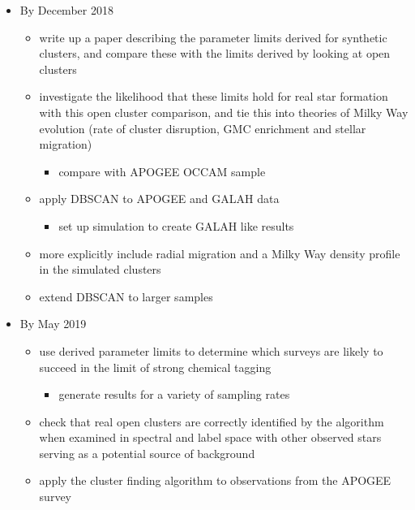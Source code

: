 \documentclass[11pt]{article}
\begin{document}
\begin{itemize}

\item By December 2018
\begin{itemize}
\item {\color{RoyalBlue} write up a paper describing the parameter limits derived for synthetic clusters, and compare these with the limits derived by looking at open clusters}
\item {\color{ForestGreen} investigate the likelihood that these limits hold for real star formation with this open cluster comparison, and tie this into theories of Milky Way evolution (rate of cluster disruption, GMC enrichment and stellar migration)}
\begin{itemize}
\item {\color{RoyalBlue} compare with APOGEE OCCAM sample}
\end{itemize}
\item {\color{ForestGreen} apply DBSCAN to APOGEE and GALAH data}
\begin{itemize}
\item set up simulation to create GALAH like results
\end{itemize}
\item {\color{RoyalBlue} more explicitly include radial migration and a Milky Way density profile in the simulated clusters}
\item {\color{ForestGreen} extend DBSCAN to larger samples}
\end{itemize}
\item By May 2019
\begin{itemize}
\item {\color{RoyalBlue} use derived parameter limits to determine which surveys are likely to succeed in the limit of strong chemical tagging}
	\begin{itemize}
		\item {\color{RoyalBlue} generate results for a variety of sampling rates}
	\end{itemize}
\item {\color{RoyalBlue} check that real open clusters are correctly identified by the algorithm when examined in spectral and label space with other observed stars serving as a potential source of background} 
\item {\color{RoyalBlue} apply the cluster finding algorithm to observations from the APOGEE survey}
\end{itemize}


\end{itemize}
\end{document}
